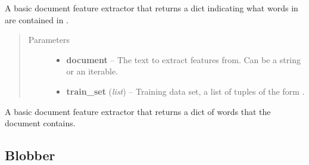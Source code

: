 \documentclass[letterpaper,10pt,english]{sphinxmanual}
\begin{document}

\begin{fulllineitems}
\label{api_reference:textblob.classifiers.basic_extractor}
A basic document feature extractor that returns a dict indicating
what words in  are contained in .
\begin{quote}\begin{description}
\item[{Parameters}] \leavevmode\begin{itemize}
\item {} 
\textbf{document} -- The text to extract features from. Can be a string or an iterable.

\item {} 
\textbf{train\_set} (\emph{list}) -- Training data set, a list of tuples of the form
.

\end{itemize}

\end{description}\end{quote}

\end{fulllineitems}


\begin{fulllineitems}
\label{api_reference:textblob.classifiers.contains_extractor}
A basic document feature extractor that returns a dict of words that
the document contains.

\end{fulllineitems}



\subsection{Blobber}
\label{api_reference:blobber}
\end{document}
